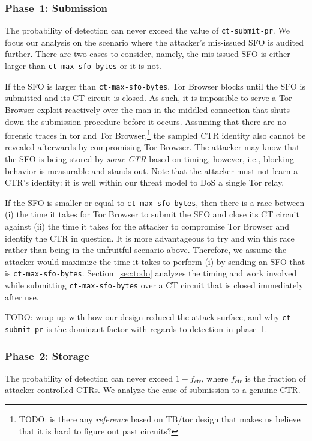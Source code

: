 \subsubsection{Phase~1: Submission} \label{sec:analysis:pr:phase1}
The probability of detection can never exceed the value of
\texttt{ct-submit-pr}.  We focus our analysis on the scenario where the
attacker's mis-issued SFO is audited further.  There are two cases to consider,
namely, the mis-issued SFO is either larger than \texttt{ct-max-sfo-bytes} or it
is not.

If the SFO is larger than \texttt{ct-max-sfo-bytes}, Tor Browser blocks until
the SFO is submitted and its CT circuit is closed.  As such, it is
impossible to serve a Tor Browser exploit reactively over the man-in-the-middled
connection that shuts-down the submission procedure before it occurs.  Assuming
that there are no forensic traces in tor and Tor Browser,\footnote{%
	TODO: is there any \emph{reference} based on TB/tor design that makes us
	believe that it is hard to figure out past circuits?
} the sampled CTR identity also cannot be revealed afterwards by compromising
Tor Browser.  The attacker may know that the SFO is being stored by \emph{some
CTR} based on timing, however, i.e., blocking-behavior is measurable and
stands out.  Note that the attacker must not learn a CTR's identity:
	it is well within our threat model to DoS a single Tor relay.

If the SFO is smaller or equal to \texttt{ct-max-sfo-bytes}, then there is a
race between (i) the time it takes for Tor Browser to submit the SFO and close
its CT circuit against (ii) the time it takes for the attacker to compromise Tor
Browser and identify the CTR in question.  It is more advantageous to try and
win this race rather than being in the unfruitful scenario above.  Therefore, we
assume the attacker would maximize the time it takes to perform (i) by sending
an SFO that is \texttt{ct-max-sfo-bytes}.  Section~\ref{sec:todo} analyzes the
timing and work involved while submitting \texttt{ct-max-sfo-bytes} over a CT
circuit that is closed immediately after use.

TODO: wrap-up with how our design reduced the attack surface, and why
\texttt{ct-submit-pr} is the dominant factor with regards to detection in
phase~1.

\subsubsection{Phase~2: Storage} \label{sec:analysis:pr:phase2}
The probability of detection can never exceed $1-f_{\mathsf{ctr}}$, where
$f_{\mathsf{ctr}}$ is the fraction of attacker-controlled CTRs.  We analyze
the case of submission to a genuine CTR.

